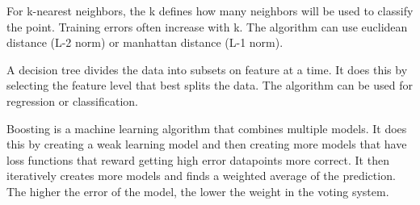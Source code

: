 \documentclass{article}
\begin{document}
For k-nearest neighbors, the k defines how many neighbors
will be used to classify the point. Training errors often increase
with k. The algorithm can use euclidean distance (L-2 norm)
or manhattan distance (L-1 norm). 

A decision tree divides the data into subsets on feature at a time.
It does this by selecting the feature level that best splits
the data. The algorithm can be used for regression or classification.

Boosting is a machine learning algorithm that combines multiple
models. It does this by creating a weak learning model and then
creating more models that have loss functions that reward
getting high error datapoints more correct. It then iteratively 
creates more models and finds a weighted average of the prediction.
The higher the error of the model, the lower the weight in the voting
system. 
\end{document}
